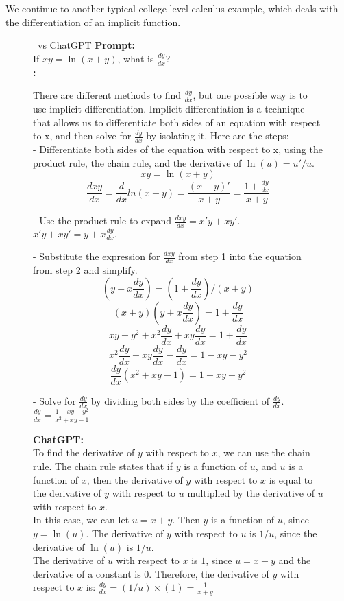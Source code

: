 We continue to another typical college-level calculus example, which deals with the differentiation of an implicit function.
\begin{figure}[H]
\begin{AIbox}{\DV \ vs ChatGPT}
{\bf Prompt:} \\
{\scriptsize
If $xy = \ln(x + y)$, what is $\frac{dy}{dx}$?
}\\

{\bf \DV:} \\
{\scriptsize
There are different methods to find $\frac{dy}{dx}$, but one possible way is to use implicit differentiation. Implicit differentiation is a technique that allows us to differentiate both sides of an equation with respect to x, and then solve for $\frac{dy}{dx}$ by isolating it. Here are the steps:\\

- Differentiate both sides of the equation with respect to x, using the product rule, the chain rule, and the derivative of $\ln(u) = u'/u$.
$$xy = \ln(x + y)$$
$$\frac{d xy}{dx} = \frac{d}{dx} ln(x + y) = \frac{(x + y)'}{x + y} = \frac{1 + \frac{dy}{dx}}{x + y}$$

- Use the product rule to expand $\frac{d xy}{dx} = x'y + xy'$.
$x'y + xy' = y + x \frac{dy}{dx}.$

- Substitute the expression for $\frac{d xy}{dx}$ from step 1 into the equation from step 2 and simplify.
$$(y + x \frac{dy}{dx}) = (1 + \frac{dy}{dx})/(x + y)$$
$$(x + y)(y + x \frac{dy}{dx}) = 1 + \frac{dy}{dx}$$
$$xy + y^2 + x^2 \frac{dy}{dx} + xy \frac{dy}{dx} = 1 + \frac{dy}{dx}$$
$$x^2 \frac{dy}{dx} + xy \frac{dy}{dx}- \frac{dy}{dx} = 1 - xy - y^2$$
$$\frac{dy}{dx}(x^2 + xy - 1) = 1 - xy - y^2$$

- Solve for $\frac{dy}{dx}$ by dividing both sides by the coefficient of $\frac{dy}{dx}$.
$\frac{dy}{dx} = \frac{1 - xy - y^2}{x^2 + xy - 1}$
}

{\bf ChatGPT:} \\
{\scriptsize
To find the derivative of $y$ with respect to $x$, we can use the chain rule. The chain rule states that if $y$ is a function of $u$, and $u$ is a function of $x$, then the derivative of $y$ with respect to $x$ is equal to the derivative of $y$ with respect to $u$ multiplied by the derivative of $u$ with respect to $x$.\\

In this case, we can let $u = x + y$. Then $y$ is a function of $u$, since $y = \ln(u)$. The derivative of $y$ with respect to $u$ is $1/u$, since the derivative of $\ln(u)$ is $1/u$.\\

The derivative of $u$ with respect to $x$ is $1$, since $u = x + y$ and the derivative of a constant is $0$. Therefore, the derivative of $y$ with respect to $x$ is:
$\frac{dy}{dx} = (1/u) \times (1) = \frac{1}{x + y}$
}
\end{AIbox}
\end{figure}

